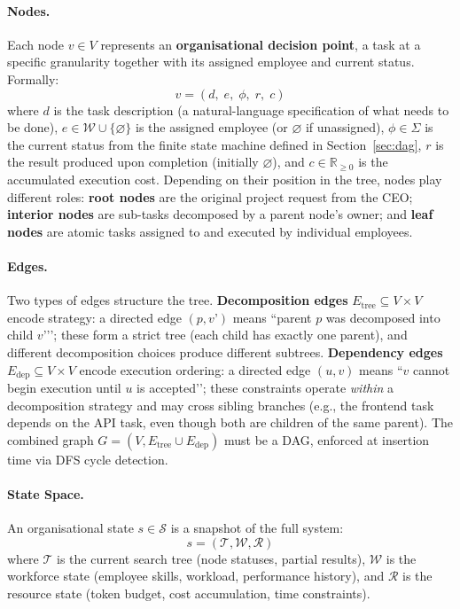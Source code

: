 \documentclass[11pt,a4paper]{article}
\begin{document}
\paragraph{Nodes.}
Each node $v \in V$ represents an \textbf{organisational decision point}, a task at a specific granularity together with its assigned employee and current status.  Formally:
\begin{equation}
v = (d,\; e,\; \phi,\; r,\; c)
\end{equation}
where $d$ is the task description (a natural-language specification of what needs to be done), $e \in \mathcal{W} \cup \{\varnothing\}$ is the assigned employee (or $\varnothing$ if unassigned), $\phi \in \Sigma$ is the current status from the finite state machine defined in Section~\ref{sec:dag}, $r$ is the result produced upon completion (initially $\varnothing$), and $c \in \mathbb{R}_{\geq 0}$ is the accumulated execution cost.  Depending on their position in the tree, nodes play different roles: \textbf{root nodes} are the original project request from the CEO; \textbf{interior nodes} are sub-tasks decomposed by a parent node's owner; and \textbf{leaf nodes} are atomic tasks assigned to and executed by individual employees.

\paragraph{Edges.}
Two types of edges structure the tree.  \textbf{Decomposition edges} $E_{\text{tree}} \subseteq V \times V$ encode strategy: a directed edge $(p, v’)$ means ``parent $p$ was decomposed into child $v’$’’; these form a strict tree (each child has exactly one parent), and different decomposition choices produce different subtrees.  \textbf{Dependency edges} $E_{\text{dep}} \subseteq V \times V$ encode execution ordering: a directed edge $(u, v)$ means ``$v$ cannot begin execution until $u$ is accepted’’; these constraints operate \emph{within} a decomposition strategy and may cross sibling branches (e.g., the frontend task depends on the API task, even though both are children of the same parent).  The combined graph $G = (V, E_{\text{tree}} \cup E_{\text{dep}})$ must be a DAG, enforced at insertion time via DFS cycle detection.

\paragraph{State Space.}
An organisational state $s \in \mathcal{S}$ is a snapshot of the full system:
\begin{equation}
s = (\mathcal{T}, \mathcal{W}, \mathcal{R})
\end{equation}
where $\mathcal{T}$ is the current search tree (node statuses, partial results), $\mathcal{W}$ is the workforce state (employee skills, workload, performance history), and $\mathcal{R}$ is the resource state (token budget, cost accumulation, time constraints).
\end{document}
